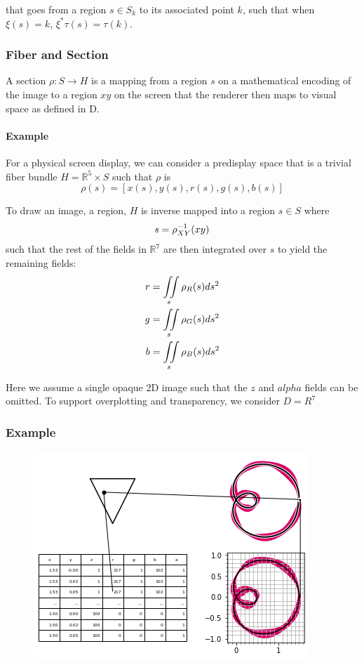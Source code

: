 \documentclass[../main.tex]{subfiles}
\begin{document}
that goes from a region $s \in S_{k}$ to its associated point $k$, such that when $\xi(s) = k$, $\xi^*\tau(s) = \tau(k)$. 

\subsubsection{Fiber and Section}
A section $\rho: S \rightarrow H$ is a mapping from a region $s$ on a mathematical encoding of the image to a region $xy$ on the screen that the renderer then maps to visual space as defined in D.

\paragraph{Example}
For a physical screen display, we can consider a predisplay space that is a trivial fiber bundle $H=\mathbb{R}^{5}\times S$ such that $\rho$ is
\begin{equation}
    \rho(s)  = [x(s), y(s), r(s), g(s), b(s)]
    \label{eq:rho}
\end{equation}

To draw an image, a region, $H$ is inverse mapped into a region $s \in S$ where
\begin{equation}
s = \rho^{-1}_{\tiny{XY}}(xy)
\end{equation}
such that the rest of the fields in $\mathbb{R}^{7}$ are then integrated over $s$ to yield the remaining fields:
\begin{align}
    r &= \iint\limits_s \rho_{\tiny{R}}(s)ds^{2}\\
    g &= \iint\limits_s \rho_{\tiny{G}}(s)ds^{2}\\
    b &= \iint\limits_s \rho_{\tiny{B}}(s)ds^{2}
\end{align}

Here we assume a single opaque 2D image such that the $z$ and $alpha$ fields can be omitted. To support overplotting and transparency, we consider $D=R^{7}$

\subsubsection{{Example}}
\begin{figure}[H]
    \includegraphics[width=.4\linewidth]{figures/sections/math/render.png}
    \caption{}
    \label{fig:render}
\end{figure}
\end{document}
